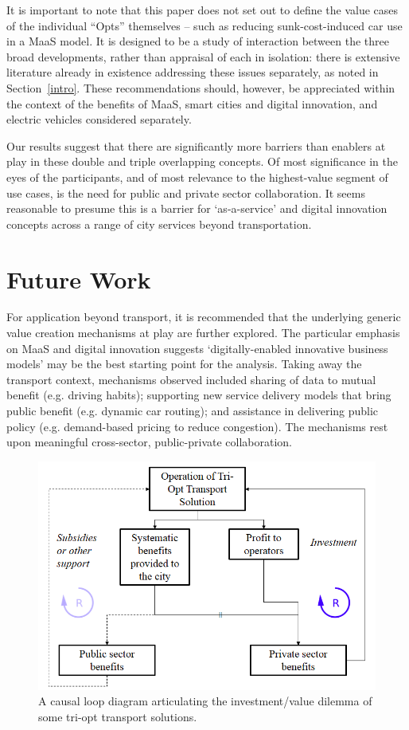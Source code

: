 \documentclass[b5paper,10pt]{article}
\begin{document}
It is important to note that this paper does not set out to define the
value cases of the individual ``Opts'' themselves -- such as reducing
sunk-cost-induced car use in a MaaS model. It is designed to be a
study of interaction between the three broad developments, rather than
appraisal of each in isolation: there is extensive literature already
in existence addressing these issues separately, as noted in
Section~\ref{intro}. These recommendations should, however, be
appreciated within the context of the benefits of MaaS, smart cities
and digital innovation, and electric vehicles considered separately.

Our results suggest that there are significantly more barriers than
enablers at play in these double and triple overlapping concepts. Of
most significance in the eyes of the participants, and of most
relevance to the highest-value segment of use cases, is the need for
public and private sector collaboration. It seems reasonable to
presume this is a barrier for `as-a-service' and digital innovation
concepts across a range of city services beyond transportation.

\section{Future Work}\label{future}

For application beyond transport, it is recommended that the
underlying generic value creation mechanisms at play are further
explored. The particular emphasis on MaaS and digital innovation
suggests `digitally-enabled innovative business models' may be the
best starting point for the analysis. Taking away the transport
context, mechanisms observed included sharing of data to mutual
benefit (e.g. driving habits); supporting new service delivery models
that bring public benefit (e.g. dynamic car routing); and assistance
in delivering public policy (e.g. demand-based pricing to reduce
congestion). The mechanisms rest upon meaningful cross-sector,
public-private collaboration.

\begin{figure}[!h]
\centering
\includegraphics[width=0.7\columnwidth]{images/causalloop.png}
\caption{A causal loop diagram articulating the investment/value
  dilemma of some tri-opt transport solutions.}
\label{fig:causalloop}
\end{figure}
\end{document}
